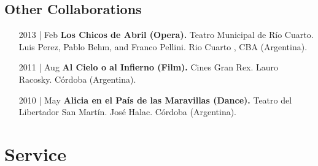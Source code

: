 \documentclass[12pt,overlapped]{res}%
\begin{document}
\begin{resume}
\subsection{Other Collaborations}%
\fullline%
\begin{itemize}[align=parleft,leftmargin=2.25cm,labelwidth=2cm]
\item[2013 | Feb]
\textbf{Los Chicos de Abril (Opera).}
Teatro Municipal de Río Cuarto. 
Luis Perez, Pablo Behm, and Franco Pellini. 
Rio Cuarto , CBA (Argentina). 
\end{itemize}%
\begin{itemize}[align=parleft,leftmargin=2.25cm,labelwidth=2cm]
\item[2011 | Aug]
\textbf{Al Cielo o al Infierno (Film).}
Cines Gran Rex. 
Lauro Racosky. 
Córdoba (Argentina). 
\end{itemize}%
\begin{itemize}[align=parleft,leftmargin=2.25cm,labelwidth=2cm]
\item[2010 | May]
\textbf{Alicia en el País de las Maravillas (Dance).}
Teatro del Libertador San Martín. 
José Halac. 
Córdoba (Argentina). 
\end{itemize}


\section{Service}%
\label{sec:Service}%

\end{resume}
\end{document}
